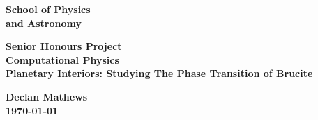 \documentclass[a4paper,12pt]{article}
\begin{document}
\pagestyle{empty}                       %
\begin{minipage}[b]{110mm}
        {\Huge\bf School of Physics\\ and Astronomy
        \vspace*{17mm}}
\end{minipage}
\hfill
\begin{minipage}[t]{40mm}               
\end{minipage}
\par\noindent                                           %
\vspace*{2cm}
\begin{center}
        \Large\bf \Large\bf Senior Honours Project\\
        \Large\bf Computational Physics\\[10pt]                     %
        \LARGE\bf Planetary Interiors: Studying The Phase Transition of Brucite        %
\end{center}
\vspace*{0.3cm}
\begin{center}
        \bf Declan Mathews\\                           %
        \today                             %
\end{center}
\vspace*{3mm}
%
%                       
\end{document}

